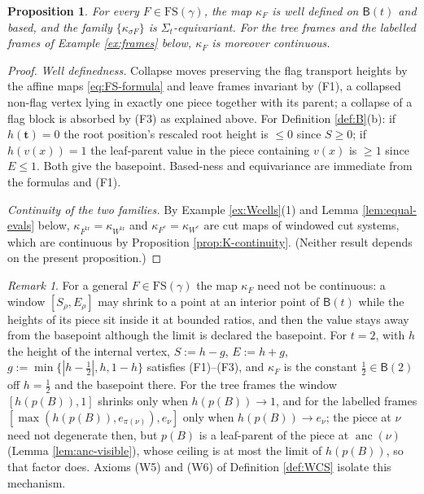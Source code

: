\documentclass[12pt]{amsart}
\newtheorem{proposition}[subsection]{Proposition}
\theoremstyle{definition}
\theoremstyle{remark}
\newtheorem{remark}[subsection]{Remark}
\newcommand{\BC}{\mathsf{B}}                     %
\newcommand{\anc}{\operatorname{anc}}            %
\begin{document}
\begin{proposition}\label{prop:FS-continuous}
For every $F\in \mathrm{FS}(\gamma)$, the map $\kappa_F$ is well defined on $\BC(t)$ and based, and the family $\{\kappa_{\sigma F}\}$ is $\Sigma_t$-equivariant. For the tree frames and the labelled frames of Example \ref{ex:frames} below, $\kappa_F$ is moreover continuous.
\end{proposition}

\begin{proof}
\emph{Well definedness.} Collapse moves preserving the flag transport heights by the affine maps \eqref{eq:FS-formula} and leave frames invariant by (F1), a collapsed non-flag vertex lying in exactly one piece together with its parent; a collapse of a flag block is absorbed by (F3) as explained above. For Definition \ref{def:B}(b): if $h(\mathbf{t})=0$ the root position's rescaled root height is $\leq 0$ since $S\geq 0$; if $h(v(x))=1$ the leaf-parent value in the piece containing $v(x)$ is $\geq 1$ since $E\leq 1$. Both give the basepoint. Based-ness and equivariance are immediate from the formulas and (F1).

\emph{Continuity of the two families.} By Example \ref{ex:Wcells}(1) and Lemma \ref{lem:equal-evals} below, $\kappa_{F^{\mathrm{tr}}} = \kappa_{W^{\mathrm{tr}}}$ and $\kappa_{F^{e}} = \kappa_{W^{e}}$ are cut maps of windowed cut systems, which are continuous by Proposition \ref{prop:K-continuity}. (Neither result depends on the present proposition.)
\end{proof}

\begin{remark}\label{rem:FS-not-cts}
For a general $F\in\mathrm{FS}(\gamma)$ the map $\kappa_F$ need not be continuous: a window $[S_\rho,E_\rho]$ may shrink to a point at an interior point of $\BC(t)$ while the heights of its piece sit inside it at bounded ratios, and then the value stays away from the basepoint although the limit is declared the basepoint. For $t=2$, with $h$ the height of the internal vertex, $S := h-g$, $E := h+g$, $g := \min\{|h-\tfrac12|, h, 1-h\}$ satisfies (F1)--(F3), and $\kappa_F$ is the constant $\tfrac12\in\BC(2)$ off $h=\tfrac12$ and the basepoint there. For the tree frames the window $[h(p(B)),1]$ shrinks only when $h(p(B))\to 1$, and for the labelled frames $[\max(h(p(B)),e_{\pi(\nu)}), e_\nu]$ only when $h(p(B))\to e_\nu$; the piece at $\nu$ need not degenerate then, but $p(B)$ is a leaf-parent of the piece at $\anc(\nu)$ (Lemma \ref{lem:anc-visible}), whose ceiling is at most the limit of $h(p(B))$, so that factor does. Axioms (W5) and (W6) of Definition \ref{def:WCS} isolate this mechanism.
\end{remark}
\end{document}
